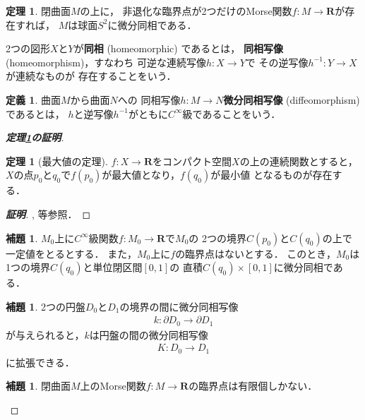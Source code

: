 \documentclass[11pt, a4paper, dvipdfmx]{jsarticle}
\theoremstyle{definition}
\newcommand{\rr}{\mathbf{R}}
\newcommand{\p}{\partial}
\theoremstyle{mystyle}
\newtheorem{DFN}[Axiom]{定義}
\newtheorem{THM}[Axiom]{定理}
\newtheorem{LMM}[Axiom]{補題}
\numberwithin{equation}{section} %
\begin{document}
\begin{THM}\label{thm:s2}
    閉曲面$M$の上に，
    非退化な臨界点が2つだけのMorse関数$f\colon M\to \rr$が存在すれば，
    $M$は球面$S^2$に微分同相である．
\end{THM}

2つの図形$X$と$Y$が\textbf{同相} (homeomorphic) であるとは，
\textbf{同相写像} (homeomorphism)，すなわち
可逆な連続写像$h\colon X\to Y$で
その逆写像$h^{-1}\colon Y\to X$が連続なものが
存在することをいう．

\begin{DFN}
    曲面$M$から曲面$N$への
    同相写像$h\colon M\to N$\textbf{微分同相写像} (diffeomorphism) であるとは，
    $h$と逆写像$h^{-1}$がともに$C^{\infty}$級であることをいう．
\end{DFN}
\begin{proof}[\upshape\textbf{定理\ref{thm:s2}の証明}]

\begin{THM}[最大値の定理]
    $f\colon X\to \rr$をコンパクト空間$X$の上の連続関数とすると，
    $X$の点$p_0$と$q_0$で$f(p_0)$が最大値となり，$f(q_0)$が最小値
    となるものが存在する．
\end{THM}
\begin{proof}[\textbf{証明}]
    \cite[命題6,3,3]{Sai09}, \cite[定理23.3]{Mo81}等参照．
\end{proof}
\begin{LMM}
    $M_0$上に$C^{\infty}$級関数$f\colon M_0\to\rr$で$M_0$の
    2つの境界$C(p_0)$と$C(q_0)$の上で一定値をとるとする．
    また，$M_0$上に$f$の臨界点はないとする．
    このとき，$M_0$は1つの境界$C(q_0)$と単位閉区間$[0,1]$の
    直積$C(q_0)\times[0,1]$に微分同相である．
\end{LMM}

\begin{LMM}2つの円盤$D_0$と$D_1$の境界の間に微分同相写像
    \begin{align}
        k\colon\p D_0\to\p D_1
    \end{align}
    が与えられると，$k$は円盤の間の微分同相写像
    \begin{align}
        K\colon D_0\to D_1
    \end{align}
    に拡張できる．
\end{LMM}

\begin{LMM}\label{lmm:crit-fin}
    閉曲面$M$上のMorse関数$f\colon M\to\rr$の臨界点は有限個しかない．
\end{LMM}

\end{proof}
\end{document}

